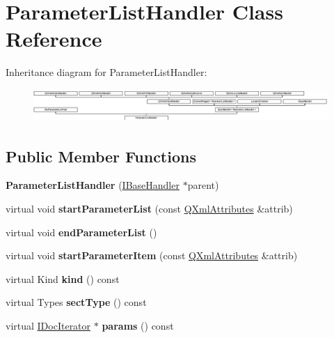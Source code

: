 \hypertarget{class_parameter_list_handler}{}\section{Parameter\+List\+Handler Class Reference}
\label{class_parameter_list_handler}
Inheritance diagram for Parameter\+List\+Handler\+:\begin{figure}[H]
\begin{center}
\leavevmode
\includegraphics[height=1.259843cm]{class_parameter_list_handler}
\end{center}
\end{figure}
\subsection*{Public Member Functions}
\begin{DoxyCompactItemize}
\item 
\mbox{\label{class_parameter_list_handler_a79a402706d36c20d37f9c5084eb2e439}} 
{\bfseries Parameter\+List\+Handler} (\mbox{\hyperlink{class_i_base_handler}{I\+Base\+Handler}} $\ast$parent)
\item 
\mbox{\label{class_parameter_list_handler_a3f090a9958cff69649191067a3ddcb10}} 
virtual void {\bfseries start\+Parameter\+List} (const \mbox{\hyperlink{class_q_xml_attributes}{Q\+Xml\+Attributes}} \&attrib)
\item 
\mbox{\label{class_parameter_list_handler_a27531ce4c09e82b3748ae4ea08d691ef}} 
virtual void {\bfseries end\+Parameter\+List} ()
\item 
\mbox{\label{class_parameter_list_handler_a6b5b525433062128616305f5016491b8}} 
virtual void {\bfseries start\+Parameter\+Item} (const \mbox{\hyperlink{class_q_xml_attributes}{Q\+Xml\+Attributes}} \&attrib)
\item 
\mbox{\label{class_parameter_list_handler_aea378af51f8c1f39b4e9f27e392a5c89}} 
virtual Kind {\bfseries kind} () const
\item 
\mbox{\label{class_parameter_list_handler_a011696e4341d51aa1552d95808b15e8f}} 
virtual Types {\bfseries sect\+Type} () const
\item 
\mbox{\label{class_parameter_list_handler_a9bfde8ce1592bfaa2e349f29f7b00e35}} 
virtual \mbox{\hyperlink{class_i_doc_iterator}{I\+Doc\+Iterator}} $\ast$ {\bfseries params} () const
\end{DoxyCompactItemize}
